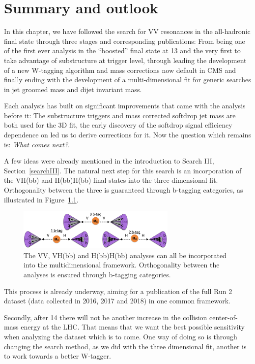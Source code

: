 \clearpage

\chapter{Summary and outlook}
\label{sec:searchIII:outlook}
In this chapter, we have followed the search for VV resonances in the all-hadronic final state through three stages and corresponding publications: From being one of the first ever analysis in the ``boosted'' final state at 13 \TeV and the very first to take advantage of substructure at trigger level, through leading the development of a new W-tagging algorithm and mass corrections now default in CMS and finally ending with the development of a multi-dimensional fit for generic searches in jet groomed mass and dijet invariant mass.\par
Each analysis has built on significant improvements that came with the analysis before it: The substructure triggers and mass corrected softdrop jet mass are both used for the 3D fit, the early discovery of the softdrop signal efficiency dependence on \PT led us to derive corrections for it. Now the question which remains is: \emph{What comes next?}.\par
A few ideas were already mentioned in the introduction to Search III, Section~\ref{searchIII}. The natural next step for this search is an incorporation of the VH(bb) and H(bb)H(bb) final states into the three-dimensional fit. Orthogonality between the three is guaranteed through b-tagging categories, as illustrated in Figure~\ref{fig:outlook:vvvhhh}.
\begin{figure}[h!]
\centering
\includegraphics[width=0.69\textwidth]{figures/analysis/search3/misc/VVVHHH.png}
\caption{The VV, VH(bb) and H(bb)H(bb) analyses can all be incorporated into the multidimensional framework. Orthogonality between the analyses is ensured through b-tagging categories.}
\label{fig:outlook:vvvhhh}
\end{figure}
This process is already underway, aiming for a publication of the full Run 2 dataset (data collected in 2016, 2017 and 2018) in one common framework.\par
Secondly, after 14 \TeV there will not be another increase in the collision center-of-mass energy at the LHC. That means that we want the best possible sensitivity when analyzing the dataset which is to come. One way of doing so is through changing the search method, as we did with the three dimensional fit, another is to work towards a better W-tagger.\par
